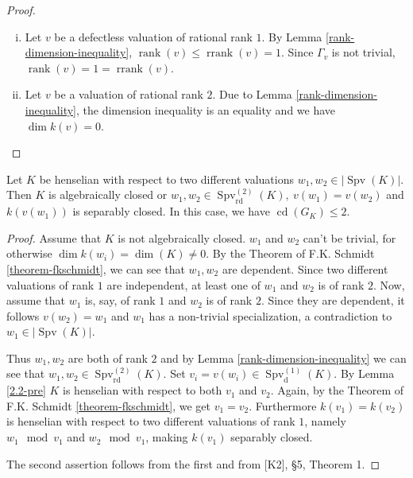 \begin{proof}
\begin{enumerate}[(i)]
\item Let $v$ be a defectless valuation of rational rank $1$. By Lemma \ref{rank-dimension-inequality}, $\operatorname{rank}(v) \leq \operatorname{rrank}(v) = 1$. Since $\Gamma_v$ is not trivial, $\operatorname{rank}(v) = 1=\operatorname{rrank}(v)$.
\item Let $v$ be a valuation of rational rank $2$. Due to Lemma \ref{rank-dimension-inequality}, the dimension inequality is an equality and we have $\dim k(v) = 0$. \qedhere
\end{enumerate}
\end{proof}

\begin{lemma}\label{2.2}
Let $K$ be henselian with respect to two different valuations $w_1,w_2\in |\operatorname{Spv}(K)|$. Then $K$ is algebraically closed or $w_1,w_2\in\operatorname{Spv}_\text{rd}^{(2)}(K),\ v(w_1)=v(w_2)$ and $k(v(w_1))$ is separably closed. In this case, we have $\operatorname{cd}(G_K)\leq 2$.
\end{lemma}

\begin{proof}
Assume that $K$ is not algebraically closed. $w_1$ and $w_2$ can't be trivial, for otherwise $\dim k(w_i)=\dim (K)\neq 0$. By the Theorem of F.K. Schmidt \ref{theorem-fkschmidt}, we can see that $w_1,w_2$ are dependent. Since two different valuations of rank $1$ are independent, at least one of $w_1$ and $w_2$ is of rank $2$. Now, assume that $w_1$ is, say, of rank $1$ and $w_2$ is of rank $2$. Since they are dependent, it follows $v(w_2) = w_1$ and $w_1$ has a non-trivial specialization, a contradiction to $w_1\in |\operatorname{Spv}(K)|$.

Thus $w_1,w_2$ are both of rank $2$ and by Lemma \ref{rank-dimension-inequality} we can see that $w_1,w_2\in\operatorname{Spv}_\text{rd}^{(2)}(K)$. Set $v_i=v(w_i)\in\operatorname{Spv}^{(1)}_\text{d}(K)$. By Lemma \ref{2.2-pre} $K$ is henselian with respect to both $v_1$ and $v_2$. Again, by the Theorem of F.K. Schmidt \ref{theorem-fkschmidt}, we get $v_1 = v_2$. Furthermore $k(v_1) = k(v_2)$ is henselian with respect to two different valuations of rank $1$, namely $w_1\mod v_1$ and $w_2\mod v_1$, making $k(v_1)$ separably closed.

The second assertion follows from the first and from [K2], §5, Theorem 1.
\end{proof}

